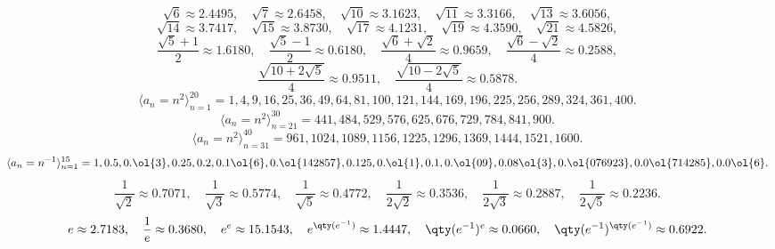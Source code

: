 \documentclass[a4paper,12pt]{article}
\begin{document}
\[\sqrt{6}\approx 2.4495,\quad\sqrt{7}\approx 2.6458,\quad\sqrt{10}\approx 3.1623,\quad\sqrt{11}\approx 3.3166,\quad\sqrt{13}\approx 3.6056,\]
\[\sqrt{14}\approx 3.7417,\quad\sqrt{15}\approx 3.8730,\quad\sqrt{17}\approx 4.1231,\quad\sqrt{19}\approx 4.3590,\quad\sqrt{21}\approx 4.5826,\]
\[\frac{\sqrt{5}+1}{2}\approx 1.6180,\quad\frac{\sqrt{5}-1}{2}\approx 0.6180,\quad\frac{\sqrt{6}+\sqrt{2}}{4}\approx 0.9659,\quad\frac{\sqrt{6}-\sqrt{2}}{4}\approx 0.2588,\]
\[\frac{\sqrt{10+2\sqrt{5}}}{4}\approx 0.9511,\quad\frac{\sqrt{10-2\sqrt{5}}}{4}\approx 0.5878.\]
\[\langle a_n=n^2\rangle_{n=1}^{20}=1,4,9,16,25,36,49,64,81,100,121,144,169,196,225,256,289,324,361,400.\]
\[\langle a_n=n^2\rangle_{n=21}^{30}=441,484,529,576,625,676,729,784,841,900.\]
\[\langle a_n=n^2\rangle_{n=31}^{40}=961,1024,1089,1156,1225,1296,1369,1444,1521,1600.\]
\[\langle a_n=n^{-1}\rangle_{n=1}^{15}=1,0.5,0.\ol{3},0.25,0.2,0.1\ol{6},0.\ol{142857},0.125,0.\ol{1},0.1,0.\ol{09},0.08\ol{3},0.\ol{076923},0.0\ol{714285},0.0\ol{6}.\]
\[\frac{1}{\sqrt{2}}\approx 0.7071,\quad\frac{1}{\sqrt{3}}\approx 0.5774,\quad\frac{1}{\sqrt{5}}\approx 0.4772,\quad\frac{1}{2\sqrt{2}}\approx 0.3536,\quad\frac{1}{2\sqrt{3}}\approx 0.2887,\quad\frac{1}{2\sqrt{5}}\approx 0.2236.\]
\[e\approx 2.7183,\quad\frac{1}{e}\approx 0.3680,\quad e^e\approx 15.1543,\quad e^{\qty(e^{-1})}\approx 1.4447,\quad \qty(e^{-1})^e\approx 0.0660,\quad\qty(e^{-1})^{\qty(e^{-1})}\approx 0.6922.\]
\end{document}
